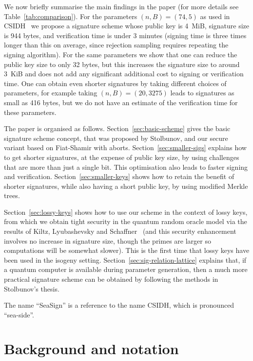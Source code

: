 \documentclass{llncs}
\newcommand{\longversion}[1]{}
\begin{document}
We now briefly summarise the main findings in the paper (for more details see Table~\ref{tab:comparison}).
For the parameters $(n,B) = (74,5)$ as used in CSIDH~\cite{CLMPR18} we propose a signature scheme whose public key is 4~MiB, signature size is 944 bytes, and verification time is under 3 minutes (signing time is three times longer than this on average, since rejection sampling requires repeating the signing algorithm). For the same parameters we show that one can reduce the public key size to only 32 bytes, but this increases the signature size to around 3~KiB and does not add any significant additional cost to signing or verification time.
One can obtain even shorter signatures by taking different choices of parameters, for example taking $(n,B) = (20,3275)$ leads to signatures as small as 416 bytes, but we do not have an estimate of the verification time for these parameters.


The paper is organised as follows.
Section~\ref{sec:basic-scheme} gives the basic signature scheme concept, that was proposed by Stolbunov, and our secure variant based on Fiat-Shamir with aborts.
Section~\ref{sec:smaller-sigs} explains how to get shorter signatures, at the expense of public key size, by using challenges that are more than just a single bit. This optimisation also leads to faster signing and verification.
Section~\ref{sec:smaller-keys} shows how to retain the benefit of shorter signatures, while also having a short public key, by using modified Merkle trees.
\longversion{
Section~\ref{sec:variants} sketches some optimisations and variants.
}
Section~\ref{sec:lossy-keys} shows how to use our scheme in the context of lossy keys, from which we obtain tight security in the quantum random oracle model via the results of Kiltz, Lyubashevsky and Schaffner~\cite{KLS18} (and this security enhancement involves no increase in signature size, though the primes are larger so computations will be somewhat slower).
This is the first time that lossy keys have been used in the isogeny setting.
Section~\ref{sec:sig-relation-lattice} explains that, if a quantum computer is available during parameter generation, then a much more practical signature scheme can be obtained by following the methods in Stolbunov's thesis.


The name ``SeaSign'' is a reference to the name CSIDH, which is pronounced ``sea-side''.




\section{Background and notation}
\end{document}
